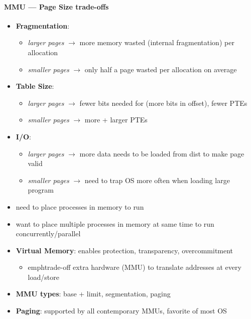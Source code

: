 \paragraph{MMU --- Page Size trade-offs}
\begin{itemize}
  \item \textbf{Fragmentation}:
  \begin{itemize}
    \item \emph{larger pages} \( \to \) more memory wasted (internal fragmentation) per allocation
    \item \emph{smaller pages} \( \to \) only half a page wasted per allocation on average
  \end{itemize}
  \item \textbf{Table Size}:
  \begin{itemize}
    \item \emph{larger pages} \( \to \) fewer bits needed for  (more bits in offset), fewer PTEs
    \item \emph{smaller pages} $ \to $ more + larger PTEs
  \end{itemize}
  \item \textbf{I/O}:
  \begin{itemize}
    \item \emph{larger pages} $ \to $ more data needs to be loaded from dist to make page valid
    \item \emph{smaller pages} $ \to $ need to trap OS more often when loading large program
  \end{itemize}
\end{itemize}

\begin{summary}
  \begin{itemize}
    \item need to place processes in memory to run
    \item want to place multiple processes in memory at same time to run concurrently/parallel
    \item \textbf{Virtual Memory}: enables protection, transparency, overcommitment
    \begin{itemize}
      \item emph{trade-off} extra hardware (MMU) to translate addresses at every load/store
    \end{itemize}
    \item \textbf{MMU types}: base + limit, segmentation, paging
    \item \textbf{Paging}: supported by all contemporary MMUs, favorite of most OS
  \end{itemize}
\end{summary}